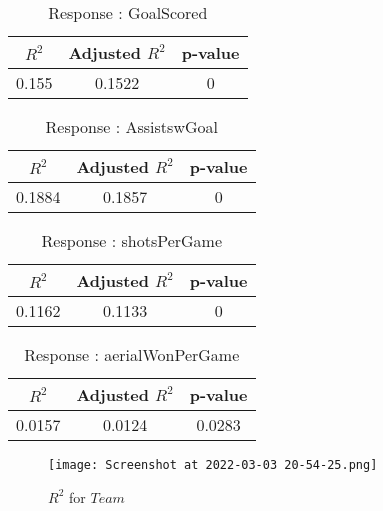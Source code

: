 \documentclass[12pt]{article}
\begin{document}
\begin{minipage}{0.5\textwidth}
	\begin{table}[H]
		\centering
		\caption{Response : GoalScored}\label{table:1a}
		{\begin{tabular}{|c|c|c|}
				\hline
				$ R^2 $ & Adjusted $ R^2 $ & p-value \\
				\hline
				0.155 & 0.1522 & 0 \\
				\hline
			\end{tabular}
		}
	\end{table} 
	\begin{table}[H]
		\centering
		\caption{Response : AssistswGoal}\label{table:1a}
		{\begin{tabular}{|c|c|c|}
				\hline
				$ R^2 $ & Adjusted $ R^2 $ & p-value \\
				\hline
				0.1884 & 0.1857 & 0 \\
				\hline
			\end{tabular}
		}
	\end{table}
\end{minipage}
\hfill
\begin{minipage}{0.5\textwidth}
	\begin{table}[H]
		\centering
		\caption{Response : shotsPerGame }\label{table:1a}
		{\begin{tabular}{|c|c|c|}
				\hline
				$ R^2 $ & Adjusted $ R^2 $ & p-value \\
				\hline
				0.1162 & 0.1133 & 0 \\
				\hline
			\end{tabular}
		}
	\end{table}
	\begin{table}[H]
		\centering
		\caption{Response : aerialWonPerGame}\label{table:1a}
		{\begin{tabular}{|c|c|c|}
				\hline
				$ R^2 $ & Adjusted $ R^2 $ & p-value \\
				\hline
				0.0157 & 0.0124 & 0.0283 \\
				\hline
			\end{tabular}
		}
	\end{table}
	
\end{minipage}

	
	\begin{figure}[H]
		\centering
		\texttt{[image: Screenshot at 2022-03-03 20-54-25.png]}
		\caption{$ R^2 $ for $ Team $}
		\label{fig:1}
	\end{figure}
	
\end{document}
